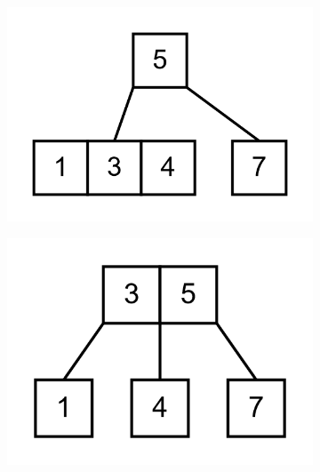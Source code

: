 \documentclass[11pt,a4paper]{article}
\begin{document}
\begin{loesung}
\begin{enumerate}
\begin{figure}[h!]
\begin{subfigure}[b]{0.20\textwidth}
                \includegraphics[width=\textwidth]{img/3b/3}
            \end{subfigure}
            \begin{subfigure}[b]{0.20\textwidth}
                \centering
                \includegraphics[width=\textwidth]{img/3b/4}
            \end{subfigure}
            \\
        \end{figure}
        \FloatBarrier


\end{enumerate}
\end{loesung}
\end{document}
